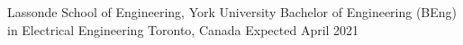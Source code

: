 


\begin{cventries}


\cventry
{Lassonde School of Engineering, York University} %
{Bachelor of Engineering (BEng) in Electrical Engineering} %
{Toronto, Canada} %
{Expected April 2021} %
{ %
\begin{cvitems}
\end{cvitems}
}


\end{cventries}